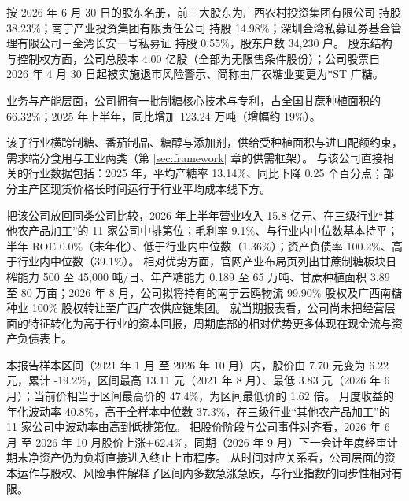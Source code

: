  按 2026 年 6 月 30 日的股东名册，前三大股东为广西农村投资集团有限公司 持股 38.23\%；南宁产业投资集团有限责任公司 持股 14.98\%；深圳金湾私募证券基金管理有限公司－金湾长安一号私募证 持股 0.55\%，股东户数 34,230 户。 股东结构与控制权方面，公司总股本 4.00 亿股（全部为无限售条件股份）；公司股票自 2026 年 4 月 30 日起被实施退市风险警示、简称由广农糖业变更为*ST 广糖。

 业务与产能层面，公司拥有一批制糖核心技术与专利，占全国甘蔗种植面积的 66.32\%；2025 年上半年，同比增加 123.24 万吨（增幅约 19\%）。

 该子行业横跨制糖、番茄制品、糖醇与添加剂，供给受种植面积与进口配额约束，需求端分食用与工业两类（第 \ref{sec:framework} 章的供需框架）。 与该公司直接相关的行业数据包括：2025 年，平均产糖率 13.14\%、同比下降 0.25 个百分点；部分主产区现货价格长时间运行于行业平均成本线下方。

 把该公司放回同类公司比较，2026 年上半年营业收入 15.8 亿元、在三级行业“其他农产品加工”的 11 家公司中排第位；毛利率 9.1\%、与行业内中位数基本持平；半年 ROE 0.0\%（未年化）、低于行业内中位数（1.36\%）；资产负债率 100.2\%、高于行业内中位数（39.1\%）。 相对优势方面，官网产业布局页列出甘蔗制糖板块日榨能力 500 至 45,000 吨/日、年产糖能力 0.189 至 65 万吨、甘蔗种植面积 3.89 至 80 万亩；2026 年 8 月，公司拟将持有的南宁云鸥物流 99.90\% 股权及广西南糖种业 100\% 股权转让至广西广农供应链集团。 就当期报表看，公司尚未把经营层面的特征转化为高于行业的资本回报，周期底部的相对优势更多体现在现金流与资产负债表上。

 本报告样本区间（2021 年 1 月 至 2026 年 10 月）内，股价由 7.70 元变为 6.22 元，累计 -19.2\%，区间最高 13.11 元（2021 年 8 月）、最低 3.83 元（2026 年 6 月）；当前价相当于区间最高价的 47.4\%，为区间最低价的 1.62 倍。 月度收益的年化波动率 40.8\%，高于全样本中位数 37.3\%，在三级行业“其他农产品加工”的 11 家公司中波动率由高到低排第位。 把股价阶段与公司事件对齐看，2026 年 6 月 至 2026 年 10 月股价上涨+62.4\%，同期（2026 年 9 月）下一会计年度经审计期末净资产仍为负将直接进入终止上市程序。 从时间对应关系看，公司层面的资本运作与股权、风险事件解释了区间内多数急涨急跌，与行业指数的同步性相对有限。

